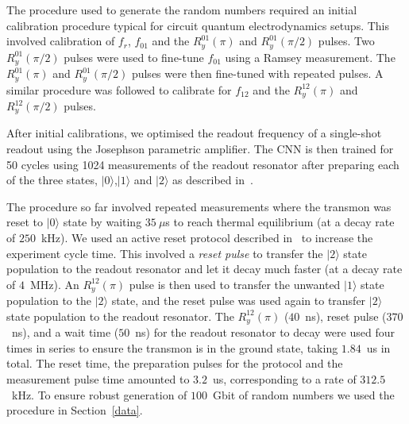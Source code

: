 \documentclass[l1pt]{elsarticle}
\begin{document}
The procedure used to generate the random numbers required an initial calibration procedure typical for circuit quantum electrodynamics setups. This involved calibration of $f_r$, $f_{01}$ and the $R^{01}_y(\pi)$ and $R^{01}_y(\pi/2)$ pulses. Two $R^{01}_y(\pi/2)$ pulses were used to fine-tune $f_{01}$ using a Ramsey measurement. The $R^{01}_y(\pi)$ and $R^{01}_y(\pi/2)$ pulses were then fine-tuned with repeated pulses. A similar procedure was followed to calibrate for $f_{12}$ and the $R^{12}_y(\pi)$ and $R^{12}_y(\pi/2)$ pulses.

After initial calibrations, we optimised the readout frequency of a single-shot readout using the Josephson parametric amplifier. The CNN is then trained for 50 cycles using 1024 measurements of the readout resonator after preparing each of the three states, $|0\rangle$,$|1\rangle$ and $|2\rangle$ as described in~\cite{navarathnaNeuralNetworksOnthefly2021}.

The procedure so far involved repeated measurements where the transmon was reset to  $|0\rangle$ state by waiting $35~\mu$s to reach thermal equilibrium (at a decay rate of $250$~kHz). We used an active reset protocol described in~\cite{Magnard2018} to increase the experiment cycle time. This involved a \textit{reset pulse} to transfer the $|2\rangle$ state population to the readout resonator and let it decay much faster (at a decay rate of $4$~MHz). An $R^{12}_y(\pi)$ pulse is then used to transfer the unwanted $|1\rangle$ state population to the $|2\rangle$ state, and the reset pulse was used again to transfer $|2\rangle$ state population to the readout resonator. The $R^{12}_y(\pi)$ ($40$~ns), reset pulse ($370$~ns), and a wait time ($50$~ns) for the readout resonator to decay were used four times in series to ensure the transmon is in the ground state, taking $1.84$~us in total. The reset time, the preparation pulses for the protocol and the measurement pulse time amounted to $3.2$~us, corresponding to a rate of $312.5$~kHz. To ensure robust generation of $100$~Gbit of random numbers we used the procedure in Section~\ref{data}.
\end{document}
